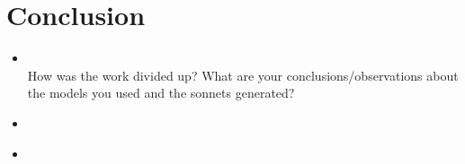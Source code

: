 \section{Conclusion}
\medskip
\begin{itemize}

    \item {} \\

        How was the work divided up?
What are your conclusions/observations about the models you used and the sonnets generated?


    \item {} \\

    \item {} \\

\end{itemize}



